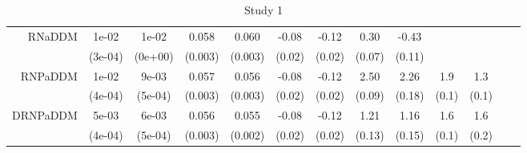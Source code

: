 \begin{table}[ht]
\begin{tabular}{|r|cc|cc|cc|cc|cc|cc|}
   \hline
RNaDDM & 1e-02 & 1e-02 & 0.058 & 0.060 & -0.08 & -0.12 &  0.30 & -0.43 &  &  &  &  \\ 
   & (3e-04) & (0e+00) & (0.003) & (0.003) & (0.02) & (0.02) & (0.07) & (0.11) &  &  &  &  \\ 
   \hline
RNPaDDM & 1e-02 & 9e-03 & 0.057 & 0.056 & -0.08 & -0.12 &  2.50 &  2.26 & 1.9 & 1.3 &  &  \\ 
   & (4e-04) & (5e-04) & (0.003) & (0.003) & (0.02) & (0.02) & (0.09) & (0.18) & (0.1) & (0.1) &  &  \\ 
   \hline
DRNPaDDM & 5e-03 & 6e-03 & 0.056 & 0.055 & -0.08 & -0.12 &  1.21 &  1.16 & 1.6 & 1.6 &  &  \\ 
   & (4e-04) & (5e-04) & (0.003) & (0.002) & (0.02) & (0.02) & (0.13) & (0.15) & (0.1) & (0.2) &  &  \\ 
   \hline
\end{tabular}
\caption{Study 1} 
\end{table}
